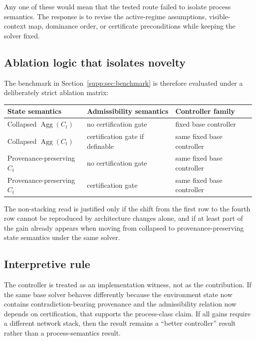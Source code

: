 \documentclass[11pt]{article}
\newcommand{\Agg}{\operatorname{Agg}}
\newcommand{\1}{\mathbf{1}}
\theoremstyle{definition}
\theoremstyle{plain}
\theoremstyle{remark}
\begin{document}
Any one of these would mean that the tested route failed to isolate process semantics. The response is to revise the active-regime assumptions, visible-context map, dominance order, or certificate preconditions while keeping the solver fixed.

\subsection{Ablation logic that isolates novelty}

The benchmark in Section~\ref{supp:sec:benchmark} is therefore evaluated under a deliberately strict ablation matrix:

\begin{center}
\begin{tabular}{lll}
\toprule
State semantics & Admissibility semantics & Controller family \\
\midrule
Collapsed $\Agg(C_t)$ & no certification gate & fixed base controller \\
Collapsed $\Agg(C_t)$ & certification gate if definable & same fixed base controller \\
Provenance-preserving $C_t$ & no certification gate & same fixed base controller \\
Provenance-preserving $C_t$ & certification gate & same fixed base controller \\
\bottomrule
\end{tabular}
\end{center}

The non-stacking read is justified only if the shift from the first row to the fourth row cannot be reproduced by architecture changes alone, and if at least part of the gain already appears when moving from collapsed to provenance-preserving state semantics under the same solver.

\subsection{Interpretive rule}

The controller is treated as an implementation witness, not as the contribution. If the same base solver behaves differently because the environment state now contains contradiction-bearing provenance and the admissibility relation now depends on certification, that supports the process-class claim. If all gains require a different network stack, then the result remains a ``better controller'' result rather than a process-semantics result.
\end{document}
